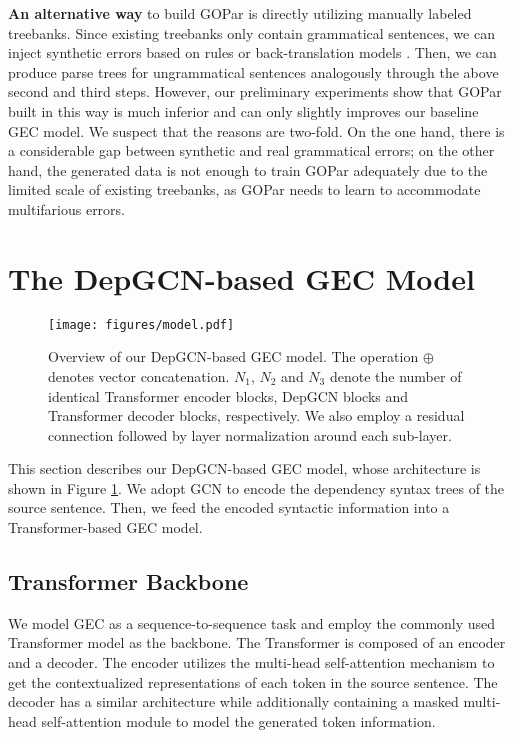 \documentclass[11pt]{article}
\begin{document}
\textbf{An alternative way} to build  GOPar is directly utilizing manually labeled treebanks. 
Since existing treebanks only contain grammatical sentences, we can inject synthetic errors based on rules or back-translation models \citep{foster2008adapting,cahill2015parsing}. 
Then, we can produce parse trees for ungrammatical sentences analogously through the above second and third steps. 
However, our preliminary experiments show that GOPar built in this way is much inferior and can only 
slightly improves our baseline GEC model.  
We suspect that the reasons are two-fold. On the one hand, there is a considerable gap between synthetic and real grammatical errors; on the other hand, the generated data is not enough to train GOPar adequately due to the limited scale of existing treebanks, as GOPar needs to learn to accommodate multifarious errors.

















 
\section{The DepGCN-based GEC Model}
\begin{figure}[t!]
\centering
\texttt{[image: figures/model.pdf]}
\caption{Overview of our DepGCN-based GEC model. The operation $\oplus$ denotes vector concatenation. $N_1$, $N_2$ and $N_3$ denote the number of identical Transformer encoder blocks, DepGCN blocks and Transformer decoder blocks, respectively. We also employ a residual connection \citep{he2016deep} followed by layer normalization \citep{DBLP:journals/corr/BaKH16} around each sub-layer.}
\label{fig:model}
\end{figure} This section describes our DepGCN-based GEC model, whose architecture is shown in Figure \ref{fig:model}.
We adopt GCN \citep{DBLP:conf/iclr/KipfW17} to encode the dependency syntax trees of the source sentence. Then, we feed the encoded syntactic information into a Transformer-based GEC model.






\subsection{Transformer Backbone}
We model GEC as a sequence-to-sequence task and employ the commonly used Transformer model \citep{vaswani2017attention} as the backbone. The Transformer is composed of an encoder and a decoder. The encoder utilizes the multi-head self-attention mechanism to get the contextualized representations of each token in the source sentence. The decoder has a similar architecture while additionally containing a masked multi-head self-attention module to model the generated token information.
\end{document}
